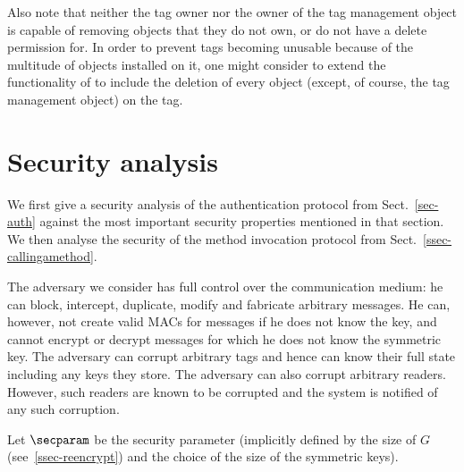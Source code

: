 Also note that neither the tag owner nor the owner of the tag management object
is capable of removing objects that they do not own, or do not have a delete permission for.
In order to prevent tags becoming unusable because of the multitude of objects installed on it,
one might consider to extend the functionality of  to include
the deletion of every object (except, of course, the tag management object) on the tag.

\section{Security analysis}
\label{sec-secanalysis}

We first give a security analysis of the authentication protocol from
Sect.~\ref{sec-auth} against the most important
security properties mentioned in that
section. We then analyse the security of the method invocation protocol
from Sect.~\ref{ssec-callingamethod}.

The adversary we consider has full control over the communication medium: he
can block, intercept, duplicate, modify and fabricate arbitrary messages. He
can, however, not create valid MACs for messages if he does not know the key,
and cannot encrypt or decrypt messages for which he does not know the symmetric
key. The adversary can corrupt arbitrary tags and hence can know their full state
including any keys they store. The adversary can also corrupt arbitrary
readers. However, such readers are known to be corrupted and the system is
notified of any such corruption.

Let $\secparam$ be the security parameter (implicitly defined by the size of
$G$ (see~\ref{ssec-reencrypt}) and the choice of the size of the symmetric keys).



